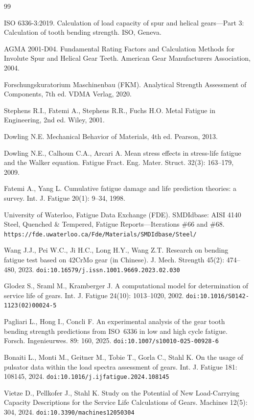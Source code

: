 \documentclass[12pt,a4paper]{article}
\begin{document}
\begin{thebibliography}{99}

ISO 6336-3:2019. Calculation of load capacity of spur and helical
gears---Part 3: Calculation of tooth bending strength. ISO, Geneva.

AGMA 2001-D04. Fundamental Rating Factors and Calculation Methods for
Involute Spur and Helical Gear Teeth. American Gear Manufacturers
Association, 2004.

Forschungskuratorium Maschinenbau (FKM). Analytical Strength Assessment
of Components, 7th ed. VDMA Verlag, 2020.

Stephens R.I., Fatemi A., Stephens R.R., Fuchs H.O. Metal Fatigue in
Engineering, 2nd ed. Wiley, 2001.

Dowling N.E. Mechanical Behavior of Materials, 4th ed. Pearson, 2013.

Dowling N.E., Calhoun C.A., Arcari A. Mean stress effects in
stress-life fatigue and the Walker equation. Fatigue Fract. Eng. Mater.
Struct. 32(3): 163--179, 2009.

Fatemi A., Yang L. Cumulative fatigue damage and life prediction
theories: a survey. Int. J. Fatigue 20(1): 9--34, 1998.

University of Waterloo, Fatigue Data Exchange (FDE). SMDIdbase: AISI
4140 Steel, Quenched \& Tempered, Fatigue Reports---Iterations \#66 and
\#68. \texttt{https://fde.uwaterloo.ca/Fde/Materials/SMDIdbase/Steel/}

Wang J.J., Pei W.C., Ji H.C., Long H.Y., Wang Z.T. Research on bending
fatigue test based on 42CrMo gear (in Chinese). J. Mech. Strength
45(2): 474--480, 2023. \texttt{doi:10.16579/j.issn.1001.9669.2023.02.030}

Glodez S., Sraml M., Kramberger J. A computational model for
determination of service life of gears. Int. J. Fatigue 24(10):
1013--1020, 2002. \texttt{doi:10.1016/S0142-1123(02)00024-5}

Pagliari L., Hong I., Concli F. An experimental analysis of the gear
tooth bending strength predictions from ISO~6336 in low and high cycle
fatigue. Forsch. Ingenieurwes. 89: 160, 2025.
\texttt{doi:10.1007/s10010-025-00928-6}

Bonaiti L., Monti M., Geitner M., Tobie T., Gorla C., Stahl K.
On the usage of pulsator data within the load spectra assessment of
gears. Int. J. Fatigue 181: 108145, 2024.
\texttt{doi:10.1016/j.ijfatigue.2024.108145}

Vietze D., Pellkofer J., Stahl K. Study on the Potential of New
Load-Carrying Capacity Descriptions for the Service Life Calculations
of Gears. Machines 12(5): 304, 2024.
\texttt{doi:10.3390/machines12050304}

\end{thebibliography}
\end{document}
